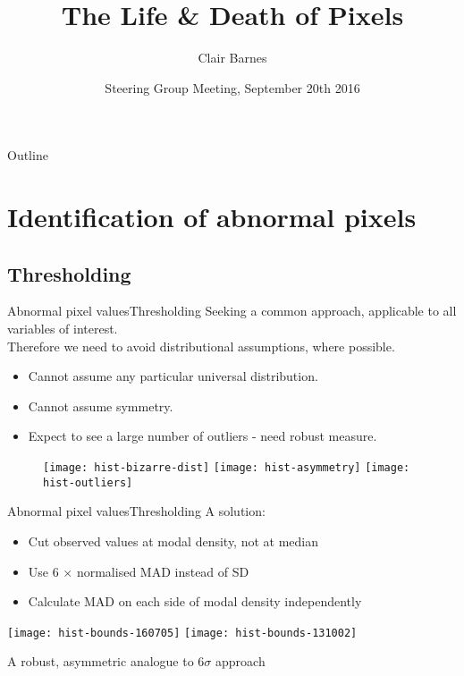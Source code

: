 \documentclass[8pt]{beamer}
\title{The Life \& Death of Pixels}
\author{Clair Barnes}
\institute[University of Warwick] %
{
  Department of Statistics \& WMG\\
  University of Warwick
}
\date{Steering Group Meeting, September 20th 2016}
\begin{document}
\begin{frame}
  \titlepage
\end{frame}

\begin{frame}{Outline}

  \tableofcontents
\end{frame}


\section{Identification of abnormal pixels}

\subsection{Thresholding}

\begin{frame}{Abnormal pixel values}{Thresholding}
Seeking a common approach, applicable to all variables of interest. \\
Therefore we need to avoid distributional assumptions, where possible.
	\begin{itemize}
		\item Cannot assume any particular universal distribution.				%
		\item Cannot assume symmetry.
		\item Expect to see a large number of outliers - need robust measure.		%
	\end{itemize}
	
	\begin{figure}[!ht]
		\texttt{[image: hist-bizarre-dist]}
		\texttt{[image: hist-asymmetry]}
		\texttt{[image: hist-outliers]}
	\end{figure}
\end{frame}


\begin{frame}{Abnormal pixel values}{Thresholding}
	A solution:
	\begin{itemize}
		\item Cut observed values at modal density, not at median
		\item Use 6 $\times$ normalised MAD instead of SD							%
		\item Calculate MAD on each side of modal density independently
	\end{itemize}
	
	\begin{center}
		\texttt{[image: hist-bounds-160705]}
		\texttt{[image: hist-bounds-131002]}
	\end{center}
	A robust, asymmetric analogue to $6\sigma$ approach
	
\end{frame}
\end{document}
